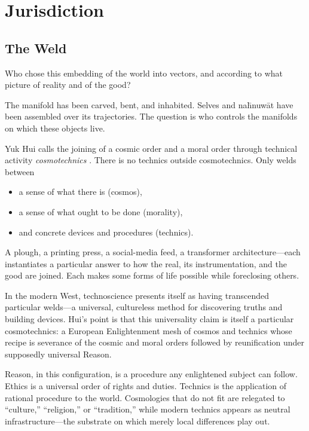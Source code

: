 \chapter{Jurisdiction}

\section{The Weld}

Who chose this embedding of the world into vectors, and according to what picture of reality and of the good?

The manifold has been carved, bent, and inhabited. Selves and na\={h}nuw\={a}t have been assembled over its trajectories. The question is who controls the manifolds on which these objects live.

Yuk Hui calls the joining of a cosmic order and a moral order through technical activity \emph{cosmotechnics} \cite{Hui2016}. There is no technics outside cosmotechnics. Only welds between

\begin{itemize}
  \item a sense of what there is (cosmos),
  \item a sense of what ought to be done (morality),
  \item and concrete devices and procedures (technics).
\end{itemize}

A plough, a printing press, a social-media feed, a transformer architecture---each instantiates a particular answer to how the real, its instrumentation, and the good are joined. Each makes some forms of life possible while foreclosing others.

In the modern West, technoscience presents itself as having transcended particular welds---a universal, cultureless method for discovering truths and building devices. Hui's point is that this universality claim is itself a particular cosmotechnics: a European Enlightenment mesh of cosmos and technics whose recipe is severance of the cosmic and moral orders followed by reunification under supposedly universal Reason.

Reason, in this configuration, is a procedure any enlightened subject can follow. Ethics is a universal order of rights and duties. Technics is the application of rational procedure to the world. Cosmologies that do not fit are relegated to ``culture,'' ``religion,'' or ``tradition,'' while modern technics appears as neutral infrastructure---the substrate on which merely local differences play out.

